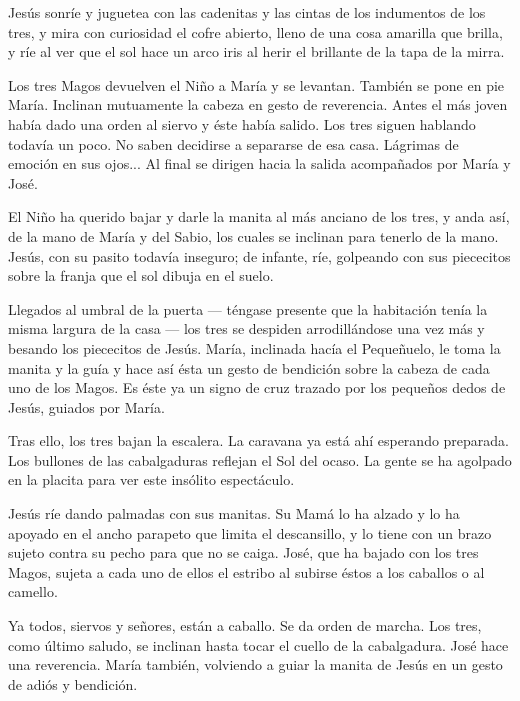 \documentclass[12pt, twoside, openright]{book} %
\begin{document}
Jesús sonríe y juguetea con las cadenitas y las cintas de los indumentos de los tres, y mira con curiosidad el cofre abierto, lleno de una cosa amarilla que brilla, y ríe al ver que el sol hace un arco iris al herir el brillante de la tapa de la mirra. 

Los tres Magos devuelven el Niño a María y se levantan. También se pone en pie María. Inclinan mutuamente la cabeza en gesto de reverencia. Antes el más joven había dado una orden al siervo y éste había salido. Los tres siguen hablando todavía un poco. No saben decidirse a separarse de esa casa. Lágrimas de emoción en sus ojos... Al final se dirigen hacia la salida acompañados por María y José. 

El Niño ha querido bajar y darle la manita al más anciano de los tres, y anda así, de la mano de María y del Sabio, los cuales se inclinan para tenerlo de la mano. Jesús, con su pasito todavía inseguro; de infante, ríe, golpeando con sus piececitos sobre la franja que el sol dibuja en el suelo. 

Llegados al umbral de la puerta — téngase presente que la habitación tenía la misma largura de la casa — los tres se despiden arrodillándose una vez más y besando los piececitos de Jesús. María, inclinada hacía el Pequeñuelo, le toma la manita y la guía y hace así ésta un gesto de bendición sobre la cabeza de cada uno de los Magos. Es éste ya un signo de cruz trazado por los pequeños dedos de Jesús, guiados por María. 

Tras ello, los tres bajan la escalera. La caravana ya está ahí esperando preparada. Los bullones de las cabalgaduras reflejan el Sol del ocaso. La gente se ha agolpado en la placita para ver este insólito espectáculo. 

Jesús ríe dando palmadas con sus manitas. Su Mamá lo ha alzado y lo ha apoyado en el ancho parapeto que limita el descansillo, y lo tiene con un brazo sujeto contra su pecho para que no se caiga. José, que ha bajado con los tres Magos, sujeta a cada uno de ellos el estribo al subirse éstos a los caballos o al camello. 

Ya todos, siervos y señores, están a caballo. Se da orden de marcha. Los tres, como último saludo, se inclinan hasta tocar el cuello de la cabalgadura. José hace una reverencia. María también, volviendo a guiar la manita de Jesús en un gesto de adiós y bendición. 
\end{document}
